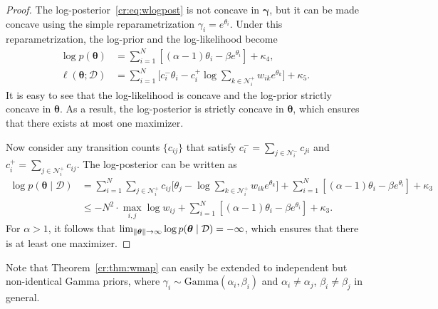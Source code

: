 \begin{proof}
The log-posterior~\eqref{cr:eq:wlogpost} is not concave in $\bm{\gamma}$, but it can be made concave using the simple reparametrization $\gamma_i = e^{\theta_i}$.
Under this reparametrization, the log-prior and the log-likelihood become
\begin{align*}
\log p(\bm{\theta})
    &= \sum_{i = 1}^N \left[ (\alpha - 1) \theta_i - \beta e^{\theta_i} \right] + \kappa_4, \\
\ell(\bm{\theta} ; \mathcal{D})
    &= \sum_{i = 1}^N \bigg[ c^-_i \theta_i - c^+_i \log \sum_{k \in \mathcal{N}^+_i} w_{ik} e^{\theta_k} \bigg] + \kappa_5.
\end{align*}
It is easy to see that the log-likelihood is concave and the log-prior strictly concave in $\bm{\theta}$.
As a result, the log-posterior is strictly concave in $\bm{\theta}$, which ensures that there exists at most one maximizer.

Now consider any transition counts $\{ c_{ij} \}$ that satisfy $c^-_i = \sum_{j \in \mathcal{N}^-_i} c_{ji}$ and $c^+_i = \sum_{j \in \mathcal{N}^+_i} c_{ij}$.
The log-posterior can be written as
\begin{align*}
\log p(\bm{\theta} \mid \mathcal{D})
    &= \sum_{i = 1}^N \sum_{j \in \mathcal{N}^+_i} c_{ij} \bigg[ \theta_j - \log \sum_{k \in \mathcal{N}^+_i} w_{ik} e^{\theta_k} \bigg]
       + \sum_{i = 1}^N \left[ (\alpha - 1) \theta_i - \beta e^{\theta_i} \right] + \kappa_3\\
    &\le -N^2 \cdot \max_{i,j} \log w_{ij}
       + \sum_{i = 1}^N \left[ (\alpha - 1) \theta_i - \beta e^{\theta_i} \right] + \kappa_3.
\end{align*}
For $\alpha > 1$, it follows that $\lim_{\lVert\bm{\theta}\rVert \to \infty} \log p(\bm{\theta} \mid \mathcal{D}) = -\infty$, which ensures that there is at least one maximizer.
\end{proof}

Note that Theorem~\ref{cr:thm:wmap} can easily be extended to independent but non-identical Gamma priors, where $\gamma_i \sim \text{Gamma}(\alpha_i, \beta_i)$ and $\alpha_i \ne \alpha_j$, $\beta_i \ne \beta_j$ in general.
